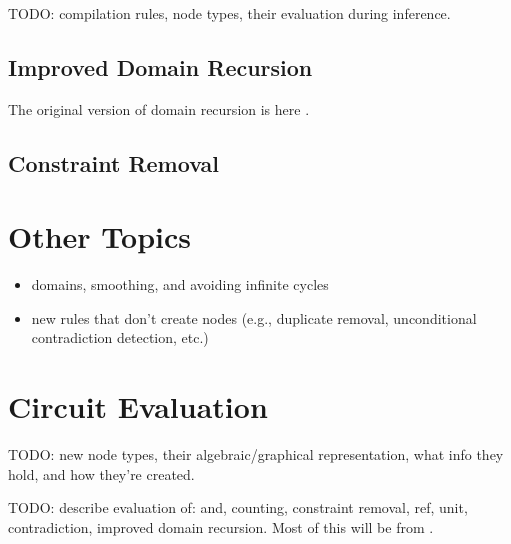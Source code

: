 \documentclass{article}
\theoremstyle{definition}
\begin{document}
TODO: compilation rules, node types, their evaluation during inference.

\subsection{Improved Domain Recursion}

The original version of domain recursion is here \cite{DBLP:conf/nips/Broeck11}.

\subsection{Constraint Removal}

\section{Other Topics}

\begin{itemize}
\item domains, smoothing, and avoiding infinite cycles
\item new rules that don't create nodes (e.g., duplicate removal, unconditional contradiction detection, etc.)
\end{itemize}

\section{Circuit Evaluation}

TODO: new node types, their algebraic/graphical representation, what info they hold, and how they're created.

TODO: describe evaluation of: and, counting, constraint removal, ref, unit, contradiction, improved domain recursion. Most of this will be from \cite{DBLP:conf/ijcai/BroeckTMDR11}.



\end{document}
